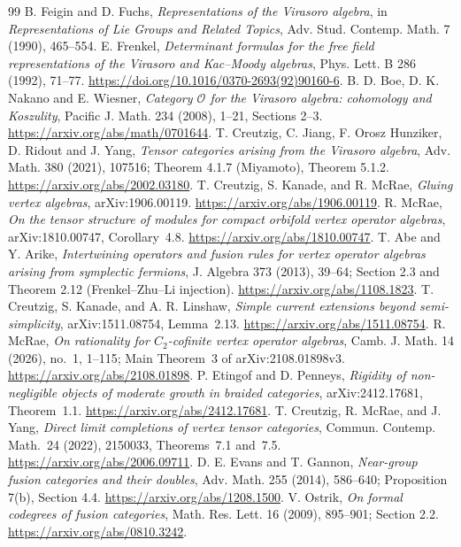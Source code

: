 \documentclass[11pt]{article}
\numberwithin{equation}{section}
\begin{document}
\begin{thebibliography}{99}
 B. Feigin and D. Fuchs, \emph{Representations of the Virasoro algebra}, in \emph{Representations of Lie Groups and Related Topics}, Adv. Stud. Contemp. Math. 7 (1990), 465--554.
 E. Frenkel, \emph{Determinant formulas for the free field representations of the Virasoro and Kac--Moody algebras}, Phys. Lett. B 286 (1992), 71--77. \url{https://doi.org/10.1016/0370-2693(92)90160-6}.
 B. D. Boe, D. K. Nakano and E. Wiesner, \emph{Category $\mathcal O$ for the Virasoro algebra: cohomology and Koszulity}, Pacific J. Math. 234 (2008), 1--21, Sections 2--3. \url{https://arxiv.org/abs/math/0701644}.
 T. Creutzig, C. Jiang, F. Orosz Hunziker, D. Ridout and J. Yang, \emph{Tensor categories arising from the Virasoro algebra}, Adv. Math. 380 (2021), 107516; Theorem 4.1.7 (Miyamoto), Theorem 5.1.2. \url{https://arxiv.org/abs/2002.03180}.
 T. Creutzig, S. Kanade, and R. McRae, \emph{Gluing vertex algebras}, arXiv:1906.00119. \url{https://arxiv.org/abs/1906.00119}.
 R. McRae, \emph{On the tensor structure of modules for compact orbifold vertex operator algebras}, arXiv:1810.00747, Corollary~4.8. \url{https://arxiv.org/abs/1810.00747}.
 T. Abe and Y. Arike, \emph{Intertwining operators and fusion rules for vertex operator algebras arising from symplectic fermions}, J. Algebra 373 (2013), 39--64; Section 2.3 and Theorem 2.12 (Frenkel--Zhu--Li injection). \url{https://arxiv.org/abs/1108.1823}.
 T. Creutzig, S. Kanade, and A. R. Linshaw, \emph{Simple current extensions beyond semi-simplicity}, arXiv:1511.08754, Lemma~2.13. \url{https://arxiv.org/abs/1511.08754}.
 R. McRae, \emph{On rationality for $C_2$-cofinite vertex operator algebras}, Camb. J. Math. 14 (2026), no.~1, 1--115; Main Theorem~3 of arXiv:2108.01898v3. \url{https://arxiv.org/abs/2108.01898}.
 P. Etingof and D. Penneys, \emph{Rigidity of non-negligible objects of moderate growth in braided categories}, arXiv:2412.17681, Theorem~1.1. \url{https://arxiv.org/abs/2412.17681}.
 T. Creutzig, R. McRae, and J. Yang, \emph{Direct limit completions of vertex tensor categories}, Commun. Contemp. Math.~24 (2022), 2150033, Theorems~7.1 and~7.5. \url{https://arxiv.org/abs/2006.09711}.
 D. E. Evans and T. Gannon, \emph{Near-group fusion categories and their doubles}, Adv. Math. 255 (2014), 586--640; Proposition 7(b), Section 4.4. \url{https://arxiv.org/abs/1208.1500}.
 V. Ostrik, \emph{On formal codegrees of fusion categories}, Math. Res. Lett. 16 (2009), 895--901; Section 2.2. \url{https://arxiv.org/abs/0810.3242}.

\end{thebibliography}
\end{document}
